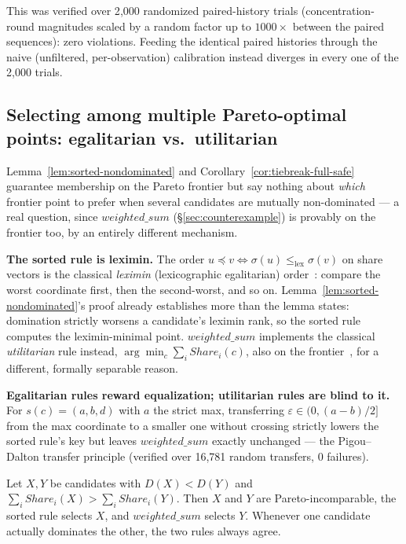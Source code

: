 \documentclass[sigconf,review,anonymous]{acmart}
\begin{document}
This was verified over 2{,}000 randomized paired-history trials (concentration-round
magnitudes scaled by a random factor up to $1000\times$ between the paired sequences): zero
violations. Feeding the identical paired histories through the naive (unfiltered,
per-observation) calibration instead diverges in every one of the 2{,}000 trials.

\subsection{Selecting among multiple Pareto-optimal points: egalitarian vs.\ utilitarian}
\label{sec:leximin}

Lemma~\ref{lem:sorted-nondominated} and Corollary~\ref{cor:tiebreak-full-safe} guarantee
membership on the Pareto frontier but say nothing about \emph{which} frontier point to prefer
when several candidates are mutually non-dominated --- a real question, since
$\mathit{weighted\_sum}$ (\S\ref{sec:counterexample}) is provably on the frontier too, by an
entirely different mechanism.

\textbf{The sorted rule is leximin.} The order $u \preceq v \iff \sigma(u) \le_{\mathrm{lex}}
\sigma(v)$ on share vectors is the classical \emph{leximin} (lexicographic egalitarian)
order~\cite{sen1970collective}: compare the worst coordinate first, then the second-worst, and
so on. Lemma~\ref{lem:sorted-nondominated}'s proof already establishes more than the lemma
states: domination strictly worsens a candidate's leximin rank, so the sorted rule computes
the leximin-minimal point. $\mathit{weighted\_sum}$ implements the classical
\emph{utilitarian} rule instead, $\arg\min_c \sum_i \mathit{Share}_i(c)$, also on the
frontier~\cite{geoffrion1968proper}, for a different, formally separable reason.

\textbf{Egalitarian rules reward equalization; utilitarian rules are blind to it.} For
$s(c) = (a,b,d)$ with $a$ the strict max, transferring $\varepsilon \in (0, (a-b)/2]$ from the
max coordinate to a smaller one without crossing strictly lowers the sorted rule's key but
leaves $\mathit{weighted\_sum}$ exactly unchanged --- the Pigou--Dalton transfer principle
(verified over 16{,}781 random transfers, 0 failures).

\begin{lemma}[Divergence]
\label{lem:divergence}
Let $X, Y$ be candidates with $D(X) < D(Y)$ and $\sum_i \mathit{Share}_i(X) > \sum_i
\mathit{Share}_i(Y)$. Then $X$ and $Y$ are Pareto-incomparable, the sorted rule selects $X$,
and $\mathit{weighted\_sum}$ selects $Y$. Whenever one candidate actually dominates the other,
the two rules always agree.
\end{lemma}
\end{document}

